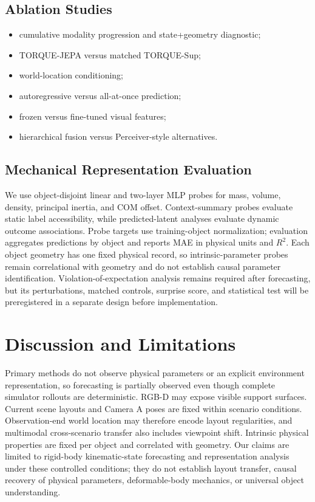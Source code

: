 \documentclass{article}
\begin{document}
\subsection{Ablation Studies}

\begin{itemize}
    \item cumulative modality progression and state+geometry diagnostic;
    \item TORQUE-JEPA versus matched TORQUE-Sup;
    \item world-location conditioning;
    \item autoregressive versus all-at-once prediction;
    \item frozen versus fine-tuned visual features;
    \item hierarchical fusion versus Perceiver-style alternatives.
\end{itemize}

\subsection{Mechanical Representation Evaluation}

We use object-disjoint linear and two-layer MLP probes for mass, volume, density, principal inertia, and COM offset. Context-summary probes evaluate static label accessibility, while predicted-latent analyses evaluate dynamic outcome associations. Probe targets use training-object normalization; evaluation aggregates predictions by object and reports MAE in physical units and $R^2$. Each object geometry has one fixed physical record, so intrinsic-parameter probes remain correlational with geometry and do not establish causal parameter identification. Violation-of-expectation analysis remains required after forecasting, but its perturbations, matched controls, surprise score, and statistical test will be preregistered in a separate design before implementation.

\section{Discussion and Limitations}

Primary methods do not observe physical parameters or an explicit environment representation, so forecasting is partially observed even though complete simulator rollouts are deterministic. RGB-D may expose visible support surfaces. Current scene layouts and Camera A poses are fixed within scenario conditions. Observation-end world location may therefore encode layout regularities, and multimodal cross-scenario transfer also includes viewpoint shift. Intrinsic physical properties are fixed per object and correlated with geometry. Our claims are limited to rigid-body kinematic-state forecasting and representation analysis under these controlled conditions; they do not establish layout transfer, causal recovery of physical parameters, deformable-body mechanics, or universal object understanding.
\end{document}
